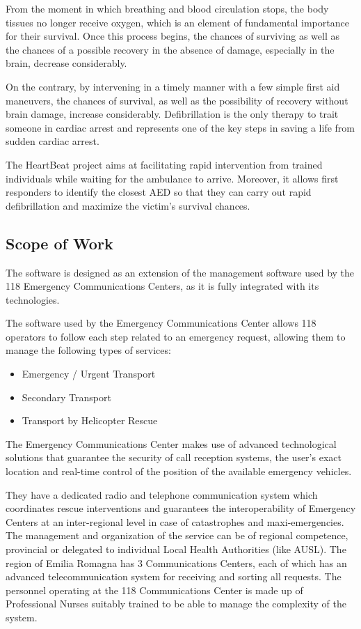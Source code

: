 \documentclass[11pt,a4paper]{article}
\begin{document}
From the moment in which breathing and blood circulation stops, the body tissues no longer receive oxygen, which is an element of fundamental importance for their survival. 
%
Once this process begins, the chances of surviving as well as the chances of a possible recovery in the absence of damage, especially in the brain, decrease considerably.

On the contrary, by intervening in a timely manner with a few simple first aid maneuvers, the chances of survival, as well as the possibility of recovery without brain damage, increase considerably.
%
Defibrillation is the only therapy to trait someone in cardiac arrest and represents one of the key steps in saving a life from sudden cardiac arrest.

The HeartBeat project aims at facilitating rapid intervention from trained individuals while waiting for the ambulance to arrive. 
%
Moreover, it allows first responders to identify the closest AED so that they can carry out rapid defibrillation and maximize the victim's survival chances.

\subsection{Scope of Work}
The software is designed as an extension of the management software used by the 118 Emergency Communications Centers, as it is fully integrated with its technologies.

The software used by the Emergency Communications Center allows 118 operators to follow each step related to an emergency request, allowing them to manage the following types of services:

\begin{itemize}
    \item Emergency / Urgent Transport
    \item Secondary Transport
    \item Transport by Helicopter Rescue
\end{itemize}

The Emergency Communications Center makes use of advanced technological solutions that guarantee the security of call reception systems, the user's exact location and real-time control of the position of the available emergency vehicles. 

They have a dedicated radio and telephone communication system which coordinates rescue interventions and guarantees the interoperability of Emergency Centers at an inter-regional level in case of catastrophes and maxi-emergencies.
%
The management and organization of the service can be of regional competence, provincial or delegated to individual Local Health Authorities (like AUSL).
%
The region of Emilia Romagna has 3 Communications Centers, each of which has an advanced telecommunication system for receiving and sorting all requests.
%
The personnel operating at the 118 Communications Center is made up of Professional Nurses suitably trained to be able to manage the complexity of the system.
\end{document}
